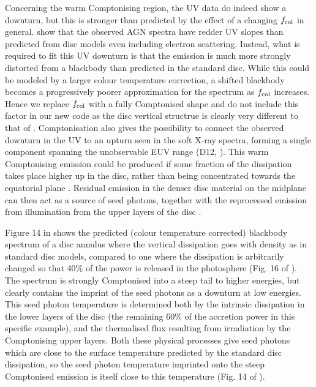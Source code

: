 \documentclass[a4paper,fleqn,usenatbib]{mnras}
\begin{document}
Concerning the warm Comptonising region, the UV data do indeed show a downturn, but this is stronger than predicted by the effect of a changing
$f_{\rm col}$ in general. 
\cite{davis2007} show that the observed AGN spectra have
redder UV slopes than predicted from disc models even including
electron scattering. Instead, what is required to fit this UV downturn
is that the emission is much more strongly distorted from a blackbody
than predicted in the standard disc. While this could be modeled by a
larger colour temperature correction, a shifted blackbody becomes a
progressively poorer approximation for the spectrum as $f_{\rm col}$
increases. Hence we replace $f_{\rm col}$ with a fully Comptonised shape and do
not include this factor in our new code as the disc vertical structrue
is clearly very different to that of \cite{ss73}. 
Comptonisation also gives the possibility to connect the observed
downturn in the UV to an upturn seen in the soft X-ray spectra,
forming a single component spanning the unobservable
EUV range (D12, \citealt{509,5548}). 
This warm Comptonising emission
could be produced if some fraction of the dissipation takes place higher up
in the disc, rather than being concentrated towards the equatorial
plane \citep{czerny2003,rozanska2015}. Residual emission in the 
denser disc material on the midplane can then act as a 
source of seed photons, together with the reprocessed emission from
illumination from the upper layers of the disc \citep{petrucci2017}. 

Figure 14 in \cite{davis2005} shows the predicted (colour temperature
corrected) blackbody spectrum of a disc annulus where the vertical
dissipation goes with density as in standard disc models, compared to
one where the dissipation is arbitrarily changed so that 40\% of the
power is released in the photosphere (Fig. 16 of
\citealt{davis2005}). The spectrum is strongly Comptonised into a
steep tail to higher energies, but clearly contains the imprint of the
seed photons as a downturn at low energies. This seed photon
temperature is determined both by the intrinsic dissipation in the
lower layers of the disc (the remaining 60\% of the accretion power in
this specific example), and the thermalised flux resulting from
irradiation by the Comptonising upper layers. Both these physical
processes give seed photons which are close to the surface temperature
predicted by the standard disc dissipation, so the seed photon
temperature imprinted onto the steep Comptonised emission is itself
close to this temperature (Fig. 14 of \citealt{davis2005}).
\end{document}
